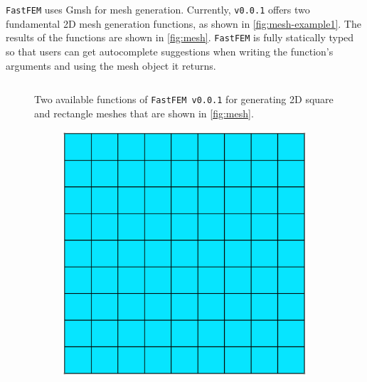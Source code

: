 \documentclass[headings=standardclasses, abstract=true]{scrartcl}
\newcommand{\pythonCodeBlock}[3]{%
    \begin{figure}
        \centering
        \begin{pythonbox}
            \inputminted[fontfamily=VSCode, baselinestretch=0.8]{python}{#1}
        \end{pythonbox}
        \caption{#2}
        \label{#3}
    \end{figure}
}
\begin{document}
\texttt{FastFEM} uses Gmsh\supercite{Gmsh} for mesh generation. Currently, \texttt{v0.0.1} offers two fundamental 2D mesh generation functions, as shown in \autoref{fig:mesh-example1}.  The results of the functions are shown in \autoref{fig:mesh}. \texttt{FastFEM} is fully statically typed so that users can get autocomplete suggestions when writing the function's arguments and using the mesh object it returns.

\pythonCodeBlock{figures/mesher-example1.py}{Two available functions of \texttt{FastFEM v0.0.1} for generating 2D square and rectangle meshes that are shown in \autoref{fig:mesh}.}{fig:mesh-example1}

\begin{figure}[H]
    \centering
    \hfill
    \begin{subfigure}[c]{0.4\textwidth}
        \centering
        \includegraphics[width=\textwidth]{figures/square_mesh.png}


\end{subfigure}
\end{figure}
\end{document}
